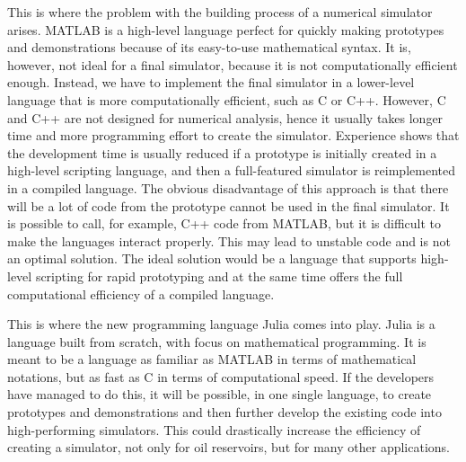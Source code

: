 This is where the problem with the building process of a numerical simulator arises. MATLAB is a high-level language perfect for quickly making prototypes and demonstrations because of its easy-to-use mathematical syntax. It is, however, not ideal for a final simulator, because it is not computationally efficient enough. Instead, we have to implement the final simulator in a lower-level language that is more computationally efficient, such as C or C++. However, C and C++ are not designed for numerical analysis, hence it usually takes longer time and more programming effort to create the simulator. Experience shows that the development time is usually reduced if a prototype is initially created in a high-level scripting language, and then a full-featured simulator is reimplemented in a compiled language. The obvious disadvantage of this approach is that there will be a lot of code from the prototype cannot be used in the final simulator. It is possible to call, for example, C++ code from MATLAB, but it is difficult to make the languages interact properly. This may lead to unstable code and is not an optimal solution. The ideal solution would be a language that supports high-level scripting for rapid prototyping and at the same time offers the full computational efficiency of a compiled language.

This is where the new programming language Julia comes into play. Julia is a language built from scratch, with focus on mathematical programming. It is meant to be a language as familiar as MATLAB in terms of mathematical notations, but as fast as C in terms of computational speed. If the developers have managed to do this, it will be possible, in one single language, to create prototypes and demonstrations and then further develop the existing code into high-performing simulators. This could drastically increase the efficiency of creating a simulator, not only for oil reservoirs, but for many other applications. 

